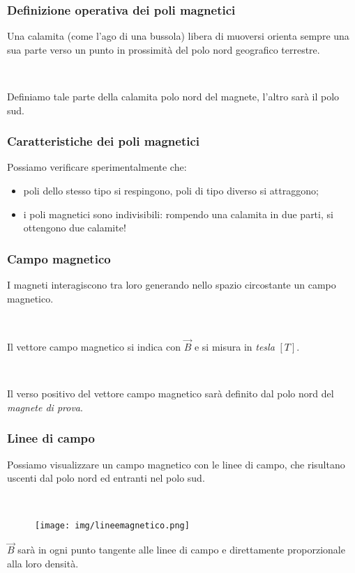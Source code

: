 \documentclass[]{beamer}
\theoremstyle{plain}
\begin{document}
\begin{frame}
\frametitle{Definizione operativa dei poli magnetici}
Una calamita (come l'ago di una bussola) libera di muoversi orienta sempre una sua parte verso un punto in prossimità del polo nord geografico terrestre.\pause

~

Definiamo tale parte della calamita \alert{polo nord} del magnete, l'altro sarà il \alert{polo sud}.
\end{frame}


\begin{frame}
\frametitle{Caratteristiche dei poli magnetici}
Possiamo verificare sperimentalmente che:
\begin{itemize}
  \item \alert<1>{poli dello stesso tipo si respingono}, poli di tipo diverso si attraggono;\pause
  \item i poli magnetici sono \alert{indivisibili}: rompendo una calamita in due parti, si ottengono due calamite!
\end{itemize}
\end{frame}


\begin{frame}
\frametitle{Campo magnetico}
I magneti interagiscono tra loro generando nello spazio circostante un \alert<1>{campo magnetico}.\pause

~

Il \alert<2>{vettore campo magnetico} si indica con $ \vec{B} $ e si misura in \emph{tesla} $ [T] $.\pause

~

Il \alert<3>{verso positivo del vettore campo magnetico} sarà definito dal polo nord del \emph{magnete di prova}.
\end{frame}



\begin{frame}
\frametitle{Linee di campo}
Possiamo visualizzare un campo magnetico con le linee di campo, che risultano \alert<1>{uscenti dal polo nord} ed entranti nel polo sud.

~

\begin{figure}
\texttt{[image: img/lineemagnetico.png]}
\end{figure}\pause
\alert{$ \vec{B} $ sarà in ogni punto tangente alle linee di campo} e direttamente proporzionale alla loro densità.
\end{frame}
\end{document}
